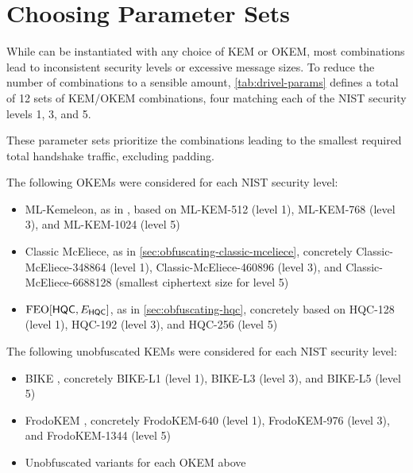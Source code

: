 \section{Choosing Parameter Sets} \label{sec:parameters}

While \drivel{} can be instantiated with any choice of KEM or OKEM, most combinations lead to inconsistent security levels or excessive message sizes. To reduce the number of combinations to a sensible amount, \cref{tab:drivel-params} defines a total of 12 sets of KEM/OKEM combinations, four matching each of the NIST security levels 1, 3, and 5.

These parameter sets prioritize the combinations leading to the smallest required total handshake traffic, excluding padding.

The following OKEMs were considered for each NIST security level:
\begin{itemize}
    \item ML-Kemeleon, as in \cite{irtf-cfrg-kemeleon-00}, based on ML-KEM-512 (level 1), ML-KEM-768 (level 3), and ML-KEM-1024 (level 5)
    \item Classic McEliece, as in \cref{sec:obfuscating-classic-mceliece}, concretely Classic-McEliece-348864 (level 1), Classic-McEliece-460896 (level 3), and Classic-McEliece-6688128 (smallest ciphertext size for level 5)
    \item $\textsf{\textnormal{FEO}}[\mathsf{HQC}, E_\mathsf{HQC}]$, as in \cref{sec:obfuscating-hqc}, concretely based on HQC-128 (level 1), HQC-192 (level 3), and HQC-256 (level 5)
\end{itemize}

The following unobfuscated KEMs were considered for each NIST security level:
\begin{itemize}
    \item BIKE \cite{NISTPQC-R4:BIKE22}, concretely BIKE-L1 (level 1), BIKE-L3 (level 3), and BIKE-L5 (level 5)
    \item FrodoKEM \cite{NISTPQC-R3:FrodoKEM20}, concretely FrodoKEM-640 (level 1), FrodoKEM-976 (level 3), and FrodoKEM-1344 (level 5)
    \item Unobfuscated variants for each OKEM above 
\end{itemize}

